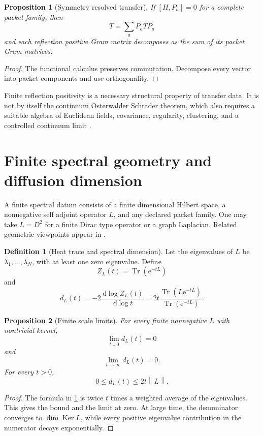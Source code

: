 \documentclass{aomart}
\newtheorem{proposition}[proposition]{Proposition}
\theoremstyle{definition}
\newtheorem{definition}[definition]{Definition}
\theoremstyle{remark}
\newcommand{\Ker}{\operatorname{Ker}}
\newcommand{\Tr}{\operatorname{Tr}}
\newcommand{\e}{\mathrm e}
\newcommand{\dd}{\,\mathrm d}
\newcommand{\norm}[1]{\left\lVert#1\right\rVert}
\begin{document}
\begin{proposition}[Symmetry resolved transfer]\label{prop:symmetry_transfer}
If \([H,P_a]=0\) for a complete packet family, then
\[
T=\sum_aP_aTP_a
\]
and each reflection positive Gram matrix decomposes as the sum of its packet Gram matrices.
\end{proposition}

\begin{proof}
The functional calculus preserves commutation. Decompose every vector into packet components and use orthogonality.
\end{proof}

Finite reflection positivity is a necessary structural property of transfer data. It is not by itself the continuum Osterwalder Schrader theorem, which also requires a suitable algebra of Euclidean fields, covariance, regularity, clustering, and a controlled continuum limit \cite{OsterwalderSchrader1973,OsterwalderSchrader1975,GlimmJaffe1987}.

\section{Finite spectral geometry and diffusion dimension}\label{sec:spectral_geometry}

A finite spectral datum consists of a finite dimensional Hilbert space, a nonnegative self adjoint operator \(L\), and any declared packet family. One may take \(L=D^2\) for a finite Dirac type operator or a graph Laplacian. Related geometric viewpoints appear in \cite{Connes1994,Vassilevich2003}.

\begin{definition}[Heat trace and spectral dimension]\label{def:spectral_dimension}
Let the eigenvalues of \(L\) be \(\lambda_1,\ldots,\lambda_N\), with at least one zero eigenvalue. Define
\[
Z_L(t)=\Tr(\e^{-tL})
\]
and
\[
d_L(t)
=-2\frac{\dd\log Z_L(t)}{\dd\log t}
=
2t
\frac{\Tr(L\e^{-tL})}{\Tr(\e^{-tL})}.
\]
\end{definition}

\begin{proposition}[Finite scale limits]\label{prop:finite_spectral_limits}
For every finite nonnegative \(L\) with nontrivial kernel,
\[
\lim_{t\downarrow0}d_L(t)=0
\]
and
\[
\lim_{t\to\infty}d_L(t)=0.
\]
For every \(t>0\),
\[
0\leq d_L(t)\leq2t\norm L.
\]
\end{proposition}

\begin{proof}
The formula in \cref{def:spectral_dimension} is twice \(t\) times a weighted average of the eigenvalues. This gives the bound and the limit at zero. At large time, the denominator converges to \(\dim\Ker L\), while every positive eigenvalue contribution in the numerator decays exponentially.
\end{proof}
\end{document}
